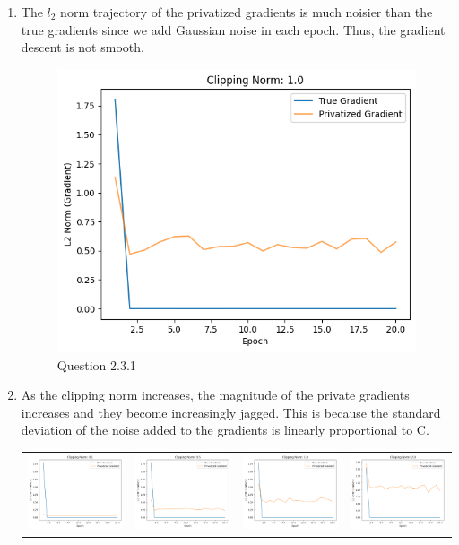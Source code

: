 \begin{enumerate}
    \item The $l_2$ norm trajectory of the privatized gradients is much noisier than the true gradients since we add Gaussian noise in each epoch. Thus, the gradient descent is not smooth.
    
    \begin{figure}[h]
        \centering
        \includegraphics[width=0.5\linewidth]{report/images/quest2-3-1.png}
        \caption{Question 2.3.1}
        \label{fig:enter-label}
    \end{figure}

    \item As the clipping norm increases, the magnitude of the private gradients increases and they become increasingly jagged. This is because the standard deviation of the noise added to the gradients is linearly proportional to C.

    \begin{tabular}{c c c c}
        \includegraphics[width=3.5cm]{report/images/1.png} & \includegraphics[width=3.5cm]{report/images/2.png} & \includegraphics[width=3.5cm]{report/images/3.png} & \includegraphics[width=3.5cm]{report/images/4.png} \\
    \end{tabular}


\end{enumerate}
